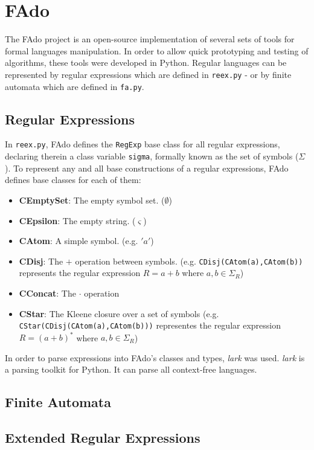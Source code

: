 \section{FAdo}
The FAdo \cite{fado_paper} project is an open-source implementation of several sets of tools for formal languages manipulation. In order to allow quick prototyping and testing of algorithms, these tools were developed in Python. Regular languages can be represented by regular expressions which are defined in \texttt{reex.py} - or by finite automata which are defined in \texttt{fa.py}.

\subsection{Regular Expressions}
In \texttt{reex.py}, FAdo defines the \texttt{RegExp} base class for all regular expressions, declaring therein a class variable \texttt{sigma}, formally known as the set of symbols ($\Sigma$).
To represent any and all base constructions of a regular expressions, FAdo defines base classes for each of them:
\begin{itemize}
    \item \textbf{CEmptySet}: The empty symbol set. ($\emptyset$)
    \item \textbf{CEpsilon}: The empty string. ($\varsigma$)
    \item \textbf{CAtom}: A simple symbol. (e.g. $'a'$)
    \item \textbf{CDisj}: The $+$ operation between symbols. (e.g. \texttt{CDisj(CAtom(a),CAtom(b))} represents the regular expression $R=a+b$ where $a,b \in \Sigma_R$)
    \item \textbf{CConcat}: The $\cdot$ operation 
    \item \textbf{CStar}: The Kleene closure over a set of symbols (e.g. \texttt{CStar(CDisj(CAtom(a),CAtom(b)))} representes the regular expression $R=(a+b)^*$ where $a,b \in \Sigma_R$)

\end{itemize}

In order to parse expressions into FAdo's classes and types, \emph{lark} was used. \emph{lark} is a parsing toolkit for Python. It can parse all context-free languages.



\subsection{Finite Automata}


\subsection{Extended Regular Expressions}
